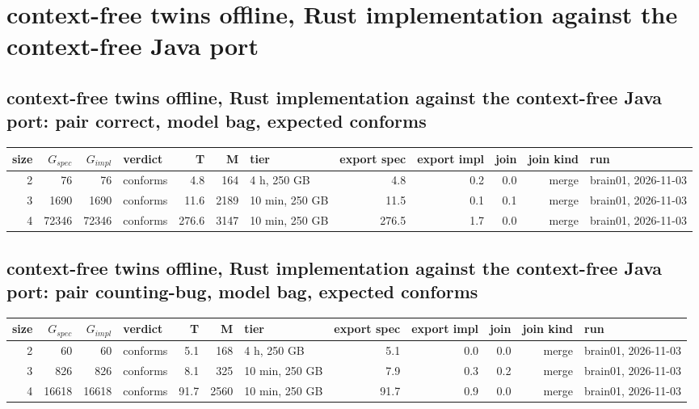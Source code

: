 \documentclass[10pt]{article}
\begin{document}
\section*{context-free twins offline, Rust implementation against the context-free Java port}
\subsection*{context-free twins offline, Rust implementation against the context-free Java port: pair \textsf{correct}, model bag, expected conforms}
\begin{longtable}{@{}rrrlrrlrrrrl@{}}
\toprule
size & $G_{\mathit{spec}}$ & $G_{\mathit{impl}}$ & verdict & T & M & tier & export spec & export impl & join & join kind & run \\
\midrule
\endhead
\color{blue} 2 & 76 & 76 & conforms & 4.8 & 164 & 4 h, 250 GB & 4.8 & 0.2 & 0.0 & merge & brain01, 2026-11-03 \\
\color{blue} 3 & 1690 & 1690 & conforms & 11.6 & 2189 & 10 min, 250 GB & 11.5 & 0.1 & 0.1 & merge & brain01, 2026-11-03 \\
\color{blue} 4 & 72346 & 72346 & conforms & 276.6 & 3147 & 10 min, 250 GB & 276.5 & 1.7 & 0.0 & merge & brain01, 2026-11-03 \\
\bottomrule
\end{longtable}
\subsection*{context-free twins offline, Rust implementation against the context-free Java port: pair \textsf{counting-bug}, model bag, expected conforms}
\begin{longtable}{@{}rrrlrrlrrrrl@{}}
\toprule
size & $G_{\mathit{spec}}$ & $G_{\mathit{impl}}$ & verdict & T & M & tier & export spec & export impl & join & join kind & run \\
\midrule
\endhead
\color{blue} 2 & 60 & 60 & conforms & 5.1 & 168 & 4 h, 250 GB & 5.1 & 0.0 & 0.0 & merge & brain01, 2026-11-03 \\
\color{blue} 3 & 826 & 826 & conforms & 8.1 & 325 & 10 min, 250 GB & 7.9 & 0.3 & 0.2 & merge & brain01, 2026-11-03 \\
\color{blue} 4 & 16618 & 16618 & conforms & 91.7 & 2560 & 10 min, 250 GB & 91.7 & 0.9 & 0.0 & merge & brain01, 2026-11-03 \\
\bottomrule
\end{longtable}
\end{document}
